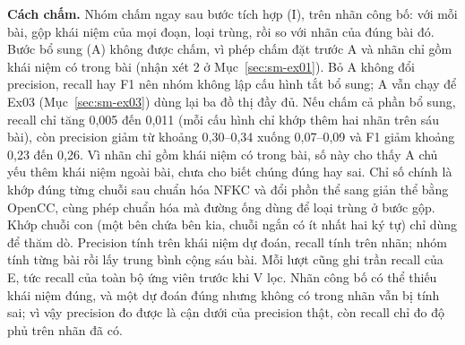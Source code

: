 \textbf{Cách chấm.}
Nhóm chấm ngay sau bước tích hợp (I), trên nhãn công bố: với mỗi bài, gộp khái niệm của mọi đoạn, loại trùng, rồi so với nhãn của đúng bài đó.
Bước bổ sung (A) không được chấm, vì phép chấm đặt trước A và nhãn chỉ gồm khái niệm có trong bài (nhận xét 2 ở Mục~\ref{sec:sm-ex01}).
Bỏ A không đổi precision, recall hay F1 nên nhóm không lập cấu hình tắt bổ sung; A vẫn chạy để Ex03 (Mục~\ref{sec:sm-ex03}) dùng lại ba đồ thị đầy đủ.
Nếu chấm cả phần bổ sung, recall chỉ tăng 0,005 đến 0,011 (mỗi cấu hình chỉ khớp thêm hai nhãn trên sáu bài), còn precision giảm từ khoảng 0,30--0,34 xuống 0,07--0,09 và F1 giảm khoảng 0,23 đến 0,26.
Vì nhãn chỉ gồm khái niệm có trong bài, số này cho thấy A chủ yếu thêm khái niệm ngoài bài, chưa cho biết chúng đúng hay sai.
Chỉ số chính là khớp đúng từng chuỗi sau chuẩn hóa NFKC và đổi phồn thể sang giản thể bằng OpenCC, cùng phép chuẩn hóa mà đường ống dùng để loại trùng ở bước gộp.
Khớp chuỗi con (một bên chứa bên kia, chuỗi ngắn có ít nhất hai ký tự) chỉ dùng để thăm dò.
Precision tính trên khái niệm dự đoán, recall tính trên nhãn; nhóm tính từng bài rồi lấy trung bình cộng sáu bài.
Mỗi lượt cũng ghi trần recall của E, tức recall của toàn bộ ứng viên trước khi V lọc.
Nhãn công bố có thể thiếu khái niệm đúng, và một dự đoán đúng nhưng không có trong nhãn vẫn bị tính sai; vì vậy precision đo được là cận dưới của precision thật, còn recall chỉ đo độ phủ trên nhãn đã có.

\begin{table}[t]
\centering
\caption{Ex02: trung bình sáu bài theo số vòng kiểm chứng. F1 là trung bình của F1 từng bài nên không bằng trung bình điều hòa của hai dòng đầu. Chi phí tính theo giá gpt-6-luna, chỉ cho E, V và A trên văn bản (không gồm ảnh và giải thích).}
\label{tab:sm-ex02-summary}
\footnotesize
\resizebox{\columnwidth}{!}{}
\end{table}

\begin{table}[t]
\centering
\caption{Ex02: precision (P), recall (R) và F1 từng bài theo số vòng kiểm chứng, khớp đúng sau chuẩn hóa. Mỗi ô là một lần chạy.}
\label{tab:sm-ex02-quality}
\footnotesize
\setlength{\tabcolsep}{4pt}

\end{table}

